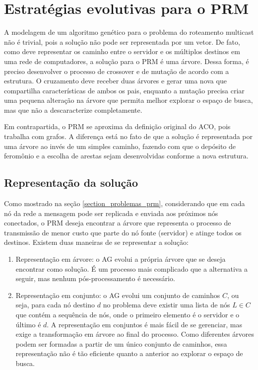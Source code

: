 \chapter[Estratégias evolutivas para o PRM]{Estratégias evolutivas para o PRM}

A modelagem de um algoritmo genético para o problema do roteamento multicast não é trivial, pois a solução não pode ser representada por um vetor. De fato, como deve representar os caminho entre o servidor e os múltiplos destinos em uma rede de computadores, a solução para o PRM é uma árvore. Dessa forma, é preciso desenvolver o processo de crossover e de mutação de acordo com a estrutura. O cruzamento deve receber duas árvores e gerar uma nova que compartilha características de ambos os pais, enquanto a mutação precisa criar uma pequena alteração na árvore que permita melhor explorar o espaço de busca, mas que não a descaracterize completamente.

Em contrapartida, o PRM se aproxima da definição original do ACO, pois trabalha com grafos. A diferença está no fato de que a solução é representada por uma árvore ao invés de um simples caminho, fazendo com que o depósito de feromônio e a escolha de arestas sejam desenvolvidas conforme a nova estrutura.

\section{Representação da solução}

Como mostrado na seção \ref{section_problemas_prm}, considerando que em cada nó da rede a mensagem pode ser replicada e enviada aos próximos nós conectados, o PRM deseja encontrar a árvore que representa o processo de transmissão de menor custo que parte do nó fonte (servidor) e atinge todos os destinos. Existem duas maneiras de se representar a solução:

\begin{enumerate}
	\item Representação em árvore: o AG evolui a própria árvore que se deseja encontrar como solução. É um processo mais complicado que a alternativa a seguir, mas nenhum pós-processamento é necessário.
	\item Representação em conjunto: o AG evolui um conjunto de caminhos $C$, ou seja, para cada nó destino $d$ no problema deve existir uma lista de nós $L \in C$ que contém a sequência de nós, onde o primeiro elemento é o servidor e o último é $d$. A representação em conjuntos é mais fácil de se gerenciar, mas exige a transformação em árvore ao final do processo. Como diferentes árvores podem ser formadas a partir de um único conjunto de caminhos, essa representação não é tão eficiente quanto a anterior ao explorar o espaço de busca.
\end{enumerate}

